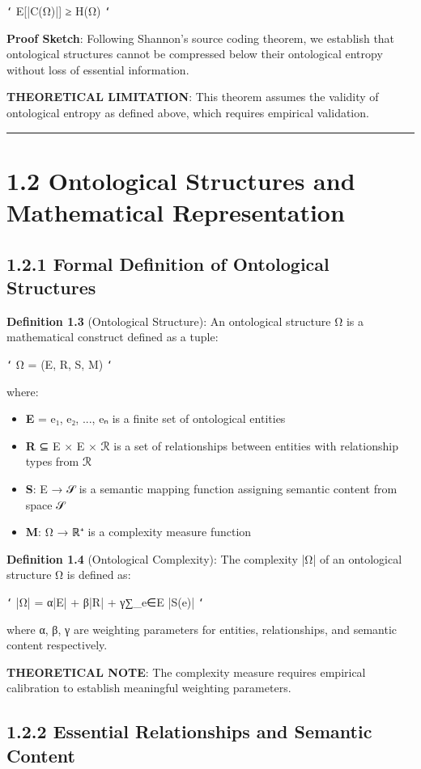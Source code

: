 \texttt{`}
E[|C(Ω)|] ≥ H(Ω)
\texttt{`}

\textbf{Proof Sketch}: Following Shannon's source coding theorem, we establish that ontological structures cannot be compressed below their ontological entropy without loss of essential information.

\textbf{THEORETICAL LIMITATION}: This theorem assumes the validity of ontological entropy as defined above, which requires empirical validation.

\hrule

\section{1.2 Ontological Structures and Mathematical Representation}

\subsection{1.2.1 Formal Definition of Ontological Structures}

\textbf{Definition 1.3} (Ontological Structure): An ontological structure Ω is a mathematical construct defined as a tuple:

\texttt{`}
Ω = (E, R, S, M)
\texttt{`}

where:
\begin{itemize}
\item \textbf{E} = {e₁, e₂, ..., eₙ} is a finite set of ontological entities
\item \textbf{R} ⊆ E × E × ℛ is a set of relationships between entities with relationship types from ℛ
\item \textbf{S}: E → 𝒮 is a semantic mapping function assigning semantic content from space 𝒮
\item \textbf{M}: Ω → ℝ⁺ is a complexity measure function
\end{itemize}

\textbf{Definition 1.4} (Ontological Complexity): The complexity |Ω| of an ontological structure Ω is defined as:

\texttt{`}
|Ω| = α|E| + β|R| + γ∑_{e∈E} |S(e)|
\texttt{`}

where α, β, γ are weighting parameters for entities, relationships, and semantic content respectively.

\textbf{THEORETICAL NOTE}: The complexity measure requires empirical calibration to establish meaningful weighting parameters.

\subsection{1.2.2 Essential Relationships and Semantic Content}

